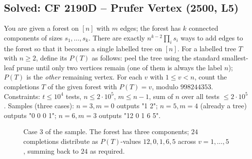 \subsection{Solved: CF 2190D -- Prufer Vertex (2500, L5)}


\begin{problemstatement}
You are given a forest on \([n]\) with \(m\) edges; the forest has \(k\)
connected components of sizes \(s_1,\dots,s_k\).  There are exactly
\(n^{k-2}\prod_i s_i\) ways to add edges to the forest so that it becomes a
single labelled tree on \([n]\).  For a labelled tree \(T\) with \(n\ge 2\),
define its  \(P(T)\) as follows: peel the tree using the
standard smallest-leaf prune until only two vertices remain (one of them is
always the label \(n\)); \(P(T)\) is the \emph{other} remaining vertex.  For
each \(v\) with \(1\le v<n\), count the completions \(T\) of the given forest
with \(P(T)=v\), modulo \(998244353\).  Constraints: \(t\le 10^4\) tests,
\(n\le 2\cdot 10^5\), \(m\le n-1\), sum of \(n\) over all tests \(\le
2\cdot 10^5\).  Samples (three cases): \(n=3, m=0\) outputs "1 2"; \(n=5,
m=4\) (already a tree) outputs "0 0 0 1"; \(n=6, m=3\) outputs "12 0 1 6 5".
\end{problemstatement}

\begin{figure}[H]
\centering
{}
\caption{Case 3 of the sample.  The forest has three components; \(24\)
completions distribute as \(P(T)\)-values \(12,0,1,6,5\) across
\(v=1,\dots,5\), summing back to \(24\) as required.}
\label{fig:c32-prufvtx}
\end{figure}

